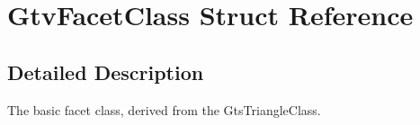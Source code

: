 \section{GtvFacetClass Struct Reference}
\label{structGtvFacetClass}


\subsection{Detailed Description}
The basic facet class, derived from the GtsTriangleClass. 

